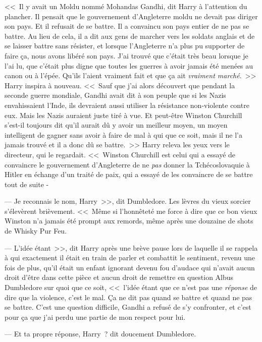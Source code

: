 <<~Il y avait un Moldu nommé Mohandas Gandhi, dit Harry à l'attention du plancher. Il pensait que le gouvernement d'Angleterre moldu ne devait pas diriger son pays. Et il refusait de se battre. Il a convaincu son pays entier de ne pas se battre. Au lieu de cela, il a dit aux gens de marcher vers les soldats anglais et de se laisser battre sans résister, et lorsque l'Angleterre n'a plus pu supporter de faire ça, nous avons libéré son pays. J'ai trouvé que c'était très beau lorsque je l'ai lu, que c'était plus digne que toutes les guerres à avoir jamais été menées au canon ou à l'épée. Qu'ils l'aient vraiment fait et que ça ait \emph{vraiment marché}.~>> Harry inspira à nouveau. <<~Sauf que j'ai alors découvert que pendant la seconde guerre mondiale, Gandhi avait dit à son peuple que si les Nazis envahissaient l'Inde, ils devraient aussi utiliser la résistance non-violente contre eux. Mais les Nazis auraient juste tiré à vue. Et peut-être Winston Churchill s'est-il toujours dit qu'il aurait dû y avoir un meilleur moyen, un moyen intelligent de gagner sans avoir à faire de mal à qui que ce soit, mais il ne l'a jamais trouvé et il a donc dû se battre.~>> Harry releva les yeux vers le directeur, qui le regardait. <<~Winston Churchill est celui qui a essayé de convaincre le gouvernement d'Angleterre de ne \emph{pas} donner la Tchécoslovaquie à Hitler en échange d'un traité de paix, qui a essayé de les convaincre de se battre tout de suite -

--- Je reconnais le nom, Harry~>>, dit Dumbledore. Les lèvres du vieux sorcier s'élevèrent brièvement. <<~Même si l'honnêteté me force à dire que ce bon vieux Winston n'a jamais été prompt aux remords, même après une douzaine de shots de Whisky Pur Feu.

--- L'idée étant~>>, dit Harry après une brève pause lors de laquelle il se rappela à qui exactement il était en train de parler et combattit le sentiment, revenu une fois de plus, qu'il était un enfant ignorant devenu fou d'audace qui n'avait aucun droit d'être dans cette pièce et aucun droit de remettre en question Albus Dumbledore sur quoi que ce soit, <<~l'idée étant que ce n'est pas une \emph{réponse} de dire que la violence, c'est le mal. Ça ne dit pas quand se battre et quand ne pas se battre. C'est une question difficile, Gandhi a refusé de s'y confronter, et c'est pour ça que j'ai perdu une partie de mon respect pour lui.

--- Et ta propre réponse, Harry~? dit doucement Dumbledore.


